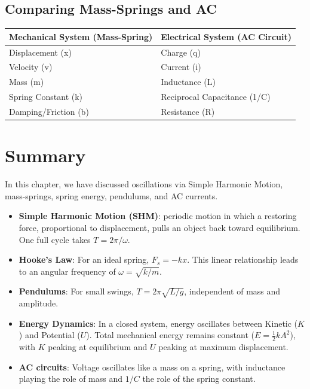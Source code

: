 \subsection{Comparing Mass-Springs and AC}
\begin{table}[!ht]
    \centering
    \begin{tabular}{|l|l|}
    \hline
        Mechanical System (Mass-Spring) & Electrical System (AC Circuit) \\ \hline
        Displacement (x) & Charge (q) \\ \hline
        Velocity (v) & Current (i) \\ \hline
        Mass (m) & Inductance (L) \\ \hline
        Spring Constant (k) & Reciprocal Capacitance (1/C) \\ \hline
        Damping/Friction (b) & Resistance (R) \\ \hline
    \end{tabular}
\end{table}
\section{Summary}
In this chapter, we have discussed oscillations via Simple Harmonic Motion, mass-springs, spring energy, pendulums, and AC currents.
\begin{itemize}
	\item \textbf{Simple Harmonic Motion (SHM)}: periodic motion in which a restoring force, proportional to displacement, pulls an object back toward equilibrium. One full cycle takes $T = 2\pi/\omega$.
	
	\item \textbf{Hooke's Law}: For an ideal spring, $F_s = -kx $. This linear relationship leads to an angular frequency of $\omega = \sqrt{k/m}$.
	\item \textbf{Pendulums}: For small swings, $T = 2\pi\sqrt{L/g}$, independent of mass and amplitude.
	\item \textbf{Energy Dynamics}: In a closed system, energy oscillates between Kinetic ($K$) and Potential ($U$). Total mechanical energy remains constant ($E = \frac{1}{2}kA^2$), with $K$ peaking at equilibrium and $U$ peaking at maximum displacement.
	\item \textbf{AC circuits}: Voltage oscillates like a mass on a spring, with inductance playing the role of mass and $1/C$ the role of the spring constant.
\end{itemize}

